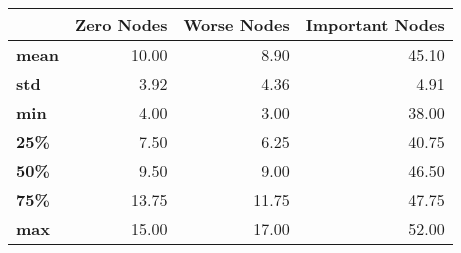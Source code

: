 \begin{tabular}{lrrr}
\toprule
{} &  Zero Nodes &  Worse Nodes &  Important Nodes \\
\midrule
\textbf{mean} &       10.00 &         8.90 &            45.10 \\
\textbf{std } &        3.92 &         4.36 &             4.91 \\
\textbf{min } &        4.00 &         3.00 &            38.00 \\
\textbf{25\% } &        7.50 &         6.25 &            40.75 \\
\textbf{50\% } &        9.50 &         9.00 &            46.50 \\
\textbf{75\% } &       13.75 &        11.75 &            47.75 \\
\textbf{max } &       15.00 &        17.00 &            52.00 \\
\bottomrule
\end{tabular}
